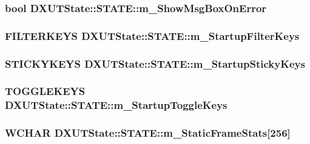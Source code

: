 \hypertarget{struct_d_x_u_t_state_1_1_s_t_a_t_e_a004e30340dddb4fa02e7b543aeffefa2}{
\subsubsection[{m\_\-ShowMsgBoxOnError}]{\setlength{\rightskip}{0pt plus 5cm}bool {\bf DXUTState::STATE::m\_\-ShowMsgBoxOnError}}}
\label{struct_d_x_u_t_state_1_1_s_t_a_t_e_a004e30340dddb4fa02e7b543aeffefa2}
\hypertarget{struct_d_x_u_t_state_1_1_s_t_a_t_e_a4ed4b6485e57b04eb5b6f8ff1ae42640}{
\subsubsection[{m\_\-StartupFilterKeys}]{\setlength{\rightskip}{0pt plus 5cm}FILTERKEYS {\bf DXUTState::STATE::m\_\-StartupFilterKeys}}}
\label{struct_d_x_u_t_state_1_1_s_t_a_t_e_a4ed4b6485e57b04eb5b6f8ff1ae42640}
\hypertarget{struct_d_x_u_t_state_1_1_s_t_a_t_e_a30b3832b5a89efc32da4e0933bad1586}{
\subsubsection[{m\_\-StartupStickyKeys}]{\setlength{\rightskip}{0pt plus 5cm}STICKYKEYS {\bf DXUTState::STATE::m\_\-StartupStickyKeys}}}
\label{struct_d_x_u_t_state_1_1_s_t_a_t_e_a30b3832b5a89efc32da4e0933bad1586}
\hypertarget{struct_d_x_u_t_state_1_1_s_t_a_t_e_acb7e05dbf1052304b48f2fcf621de46c}{
\subsubsection[{m\_\-StartupToggleKeys}]{\setlength{\rightskip}{0pt plus 5cm}TOGGLEKEYS {\bf DXUTState::STATE::m\_\-StartupToggleKeys}}}
\label{struct_d_x_u_t_state_1_1_s_t_a_t_e_acb7e05dbf1052304b48f2fcf621de46c}
\hypertarget{struct_d_x_u_t_state_1_1_s_t_a_t_e_aa4b70ae5dbeca009b9a185e49ba9bdee}{
\subsubsection[{m\_\-StaticFrameStats}]{\setlength{\rightskip}{0pt plus 5cm}WCHAR {\bf DXUTState::STATE::m\_\-StaticFrameStats}\mbox{[}256\mbox{]}}}
